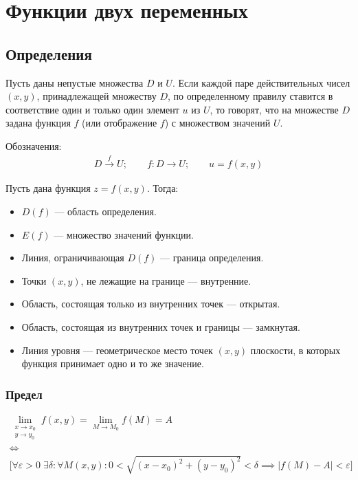 \documentclass[a4paper,12pt,oneside]{extbook}
\theoremstyle{numbered}
\theoremstyle{unnumbered}
\theoremstyle{named}
\theoremstyle{unnumbered}
\theoremstyle{named}
\theoremstyle{named}
\theoremstyle{named}
\begin{document}
\chapter{Функции двух переменных}%
\label{cha:Функции двух переменных}

\section{Определения}%
\label{sec:Определения}

\begin{siderules}
    Пусть даны непустые множества \(D\) и \(U\). Если каждой паре действительных чисел \((x, y)\), принадлежащей множеству \(D\), по определенному правилу ставится в соответствие один и только один элемент \(u\) из \(U\), то говорят, что на множестве \(D\) задана функция \(f\) (или отображение \(f\)) с множеством значений \(U\).
\end{siderules}

Обозначения:
\begin{gather*}
    D \overset{f} \rightarrow U; \qquad f: D \rightarrow U; \qquad u = f(x, y)
\end{gather*}


Пусть дана функция \(z = f(x, y)\). Тогда:
\begin{itemize}
    \item {\(D(f)\) — область определения.}
    \item {\(E(f)\) — множество значений функции.}
    \item {Линия, ограничивающая \(D(f)\) — граница определения.}
    \item {Точки \((x, y)\), не лежащие на границе — внутренние.}
    \item {Область, состоящая только из внутренних точек — открытая.}
    \item {Область, состоящая из внутренних точек и границы — замкнутая.}
    \item {Линия уровня — геометрическое место точек \((x, y)\) плоскости, в которых функция принимает одно и то же значение.}
\end{itemize}


\subsection{Предел}%
\label{sub:Предел}
\begin{gather*}
    \lim_{\substack{x \to x_0 \\ y \to y_0}}{f(x, y)} = \lim_{M \to M_0}{f(M)} = A \\
    \iff \\
    \Big[ \forall \varepsilon > 0 \; \exists \delta: \forall M(x, y): 0 < \sqrt{(x - x_0)^2 + (y - y_0)^2} < \delta \implies |f(M) - A| < \varepsilon \Big]
\end{gather*}
\end{document}
